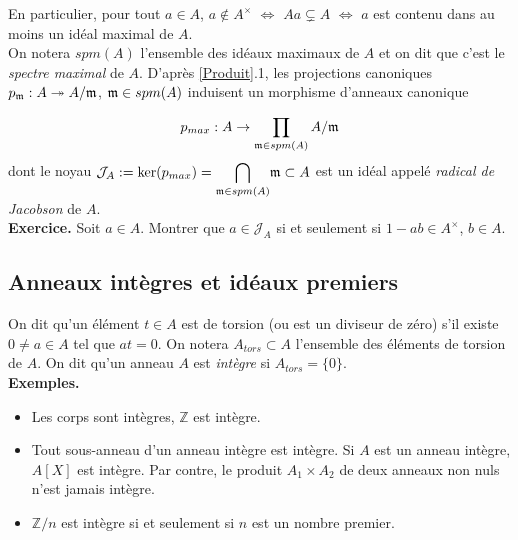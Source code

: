 \documentclass[a4paper, oneside, 12pt]{book}
\theoremstyle{definition} %
\newcommand{\Z}{\mathbb{Z}}
\begin{document}
 En particulier, pour tout $a\in A$, $a\notin A^\times$ $\Leftrightarrow$ $Aa\subsetneq A$  $\Leftrightarrow$ $a$ est contenu dans au moins un  idéal maximal de $A$.\\




 On notera $spm(A)$ l'ensemble des idéaux maximaux de $A$ et on dit que c'est le \textit{spectre maximal} de $A$. D'après \ref{Produit}.1, les projections canoniques $p_{\frak{m}}:A\twoheadrightarrow A/\frak{m}$, $\frak{m}\in spm(A)$ induisent un morphisme d'anneaux canonique 

$$p_{max}:A\rightarrow \prod_{\frak{m}\in spm(A)}A/\frak{m}$$
dont le noyau  $\mathcal{J}_A:=\ker(p_{max})=\displaystyle{\bigcap_{\frak{m}\in spm(A)}}\frak{m}\subset A$ est un idéal  appelé \textit{radical de Jacobson} de $A$.\\

\textbf{Exercice.} Soit $a\in A$. Montrer que $a\in \mathcal{J}_A$ si et seulement si $1-ab\in A^\times$, $b\in A$. \\

 




  \subsection{Anneaux intègres et idéaux premiers}\label{Integre} On dit qu'un élément $t\in A$ est de torsion (ou est un diviseur de zéro) s'il existe $0\not= a\in A$ tel que $at=0$. On notera $A_{tors}\subset A$ l'ensemble des éléments de torsion de $A$. On dit qu'un anneau $A$ est \textit{intègre} si $A_{tors}=\lbrace 0\rbrace $.\\
  
 \textbf{Exemples.}
   \begin{itemize}[leftmargin=* ,parsep=0cm,itemsep=0cm,topsep=0cm]
     \item Les corps  sont intègres, $\Z$ est intègre.
     \item Tout sous-anneau d'un anneau intègre est intègre. Si $A$ est un anneau intègre, $A[X]$ est intègre. Par contre, le produit $A_1\times A_2$ de deux anneaux non nuls n'est jamais intègre.
     \item $\Z/n$ est intègre si et seulement si $n$ est un nombre premier. \\
\end{itemize}
 
\end{document}
